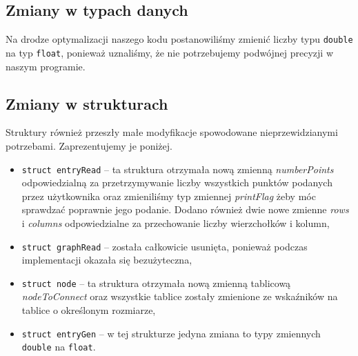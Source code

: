 \documentclass[10pt, a4paper]{report}
\begin{document}
    \subsection{Zmiany w typach danych}
    Na drodze optymalizacji naszego kodu postanowiliśmy zmienić liczby typu \texttt{double} na typ \texttt{float}, ponieważ uznaliśmy, że nie potrzebujemy
    podwójnej precyzji w naszym programie.
    
    \subsection{Zmiany w strukturach}
    Struktury również przeszły małe modyfikacje spowodowane nieprzewidzianymi potrzebami. Zaprezentujemy je poniżej.
    \begin{itemize}
        \item \texttt{struct entryRead} -- ta struktura otrzymała nową zmienną \textit{numberPoints} odpowiedzialną za przetrzymywanie liczby
        wszystkich punktów podanych przez użytkownika oraz zmieniliśmy typ zmiennej \textit{printFlag} żeby móc sprawdzać poprawnie jego podanie. Dodano również
        dwie nowe zmienne \textit{rows} i \textit{columns} odpowiedzialne za przechowanie liczby wierzchołków i kolumn,
        
        \item \texttt{struct graphRead} -- została całkowicie usunięta, ponieważ podczas implementacji okazała się bezużyteczna,
        \item \texttt{struct node} -- ta struktura otrzymała nową zmienną tablicową \textit{nodeToConnect} oraz wszystkie tablice zostały zmienione ze wskaźników na tablice o określonym rozmiarze,
        
        \item \texttt{struct entryGen} -- w tej strukturze jedyna zmiana to typy zmiennych \texttt{double} na \texttt{float}.
        
    \end{itemize}
\end{document}

